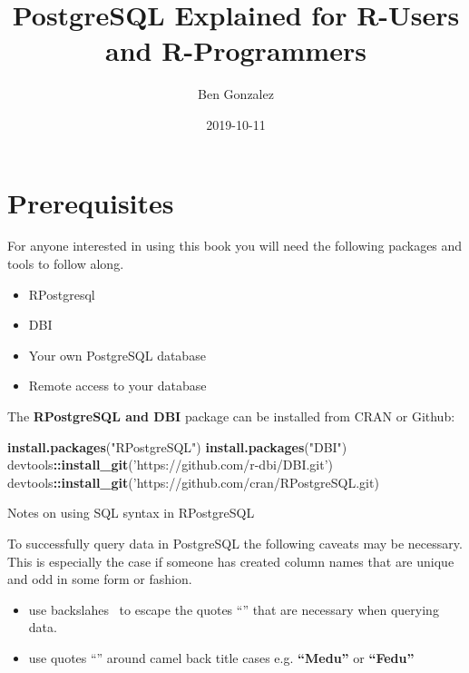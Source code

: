 \documentclass[]{book}
\title{PostgreSQL Explained for R-Users and R-Programmers}
\author{Ben Gonzalez}
\date{2019-10-11}
\newenvironment{Shaded}{\begin{snugshade}}{\end{snugshade}}
\newcommand{\KeywordTok}[1]{\textcolor[rgb]{0.13,0.29,0.53}{\textbf{#1}}}
\newcommand{\StringTok}[1]{\textcolor[rgb]{0.31,0.60,0.02}{#1}}
\newcommand{\OperatorTok}[1]{\textcolor[rgb]{0.81,0.36,0.00}{\textbf{#1}}}
\newcommand{\NormalTok}[1]{#1}
\providecommand{\tightlist}{%
  \setlength{\itemsep}{0pt}\setlength{\parskip}{0pt}}
\begin{document}
\maketitle

{
\setcounter{tocdepth}{1}
\tableofcontents
}
\chapter{Prerequisites}\label{prerequisites}

For anyone interested in using this book you will need the following
packages and tools to follow along.

\begin{itemize}
\tightlist
\item
  RPostgresql
\item
  DBI
\item
  Your own PostgreSQL database
\item
  Remote access to your database
\end{itemize}

The \textbf{RPostgreSQL and DBI} package can be installed from CRAN or
Github:

\begin{Shaded}
\begin{Highlighting}[]
\KeywordTok{install.packages}\NormalTok{(}\StringTok{"RPostgreSQL"}\NormalTok{)}
\KeywordTok{install.packages}\NormalTok{(}\StringTok{"DBI"}\NormalTok{)}
\NormalTok{devtools}\OperatorTok{::}\KeywordTok{install_git}\NormalTok{(}\StringTok{'https://github.com/r-dbi/DBI.git'}\NormalTok{)}
\NormalTok{devtools}\OperatorTok{::}\KeywordTok{install_git}\NormalTok{(}\StringTok{'https://github.com/cran/RPostgreSQL.git)}
\end{Highlighting}
\end{Shaded}

Notes on using SQL syntax in RPostgreSQL

To successfully query data in PostgreSQL the following caveats may be
necessary. This is especially the case if someone has created column
names that are unique and odd in some form or fashion.

\begin{itemize}
\tightlist
\item
  use backslahes ~to escape the quotes ``'' that are necessary when
  querying data.
\item
  use quotes ``'' around camel back title cases e.g. \textbf{``Medu''}
  or \textbf{``Fedu''}
\end{itemize}
\end{document}
